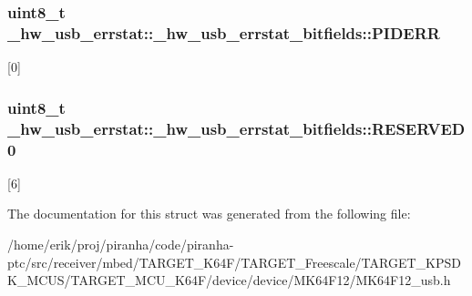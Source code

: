 \subsubsection[{\texorpdfstring{P\+I\+D\+E\+RR}{PIDERR}}]{\setlength{\rightskip}{0pt plus 5cm}uint8\+\_\+t \+\_\+hw\+\_\+usb\+\_\+errstat\+::\+\_\+hw\+\_\+usb\+\_\+errstat\+\_\+bitfields\+::\+P\+I\+D\+E\+RR}\hypertarget{struct__hw__usb__errstat_1_1__hw__usb__errstat__bitfields_aeb3aaa7b0f24a663e620380605961df0}{}\label{struct__hw__usb__errstat_1_1__hw__usb__errstat__bitfields_aeb3aaa7b0f24a663e620380605961df0}
\mbox{[}0\mbox{]} 
\subsubsection[{\texorpdfstring{R\+E\+S\+E\+R\+V\+E\+D0}{RESERVED0}}]{\setlength{\rightskip}{0pt plus 5cm}uint8\+\_\+t \+\_\+hw\+\_\+usb\+\_\+errstat\+::\+\_\+hw\+\_\+usb\+\_\+errstat\+\_\+bitfields\+::\+R\+E\+S\+E\+R\+V\+E\+D0}\hypertarget{struct__hw__usb__errstat_1_1__hw__usb__errstat__bitfields_a063707ff75c18b1c5932d558827be3c9}{}\label{struct__hw__usb__errstat_1_1__hw__usb__errstat__bitfields_a063707ff75c18b1c5932d558827be3c9}
\mbox{[}6\mbox{]} 

The documentation for this struct was generated from the following file\+:\begin{DoxyCompactItemize}
\item 
/home/erik/proj/piranha/code/piranha-\/ptc/src/receiver/mbed/\+T\+A\+R\+G\+E\+T\+\_\+\+K64\+F/\+T\+A\+R\+G\+E\+T\+\_\+\+Freescale/\+T\+A\+R\+G\+E\+T\+\_\+\+K\+P\+S\+D\+K\+\_\+\+M\+C\+U\+S/\+T\+A\+R\+G\+E\+T\+\_\+\+M\+C\+U\+\_\+\+K64\+F/device/device/\+M\+K64\+F12/M\+K64\+F12\+\_\+usb.\+h\end{DoxyCompactItemize}
